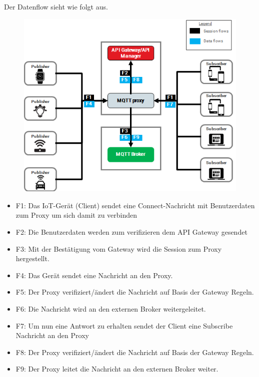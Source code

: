     Der Datenflow sieht wie folgt aus.
    \begin{figure}[h]%
        \centering
        \includegraphics[width=14cm]{tex/bilder/2_grundlagen/axway-mqtt-proxy02_short.png}
        \label{fig:axway-proxy}
    \end{figure}
    \begin{itemize}
        \item F1: Das \ac{IoT}-Gerät (Client) sendet eine Connect-Nachricht mit Benutzerdaten zum Proxy um sich damit zu verbinden
        \item F2: Die Benutzerdaten werden zum verifizieren dem API Gateway gesendet
        \item F3: Mit der Bestätigung vom Gateway wird die Session zum Proxy hergestellt.
        \item F4: Das Gerät sendet eine Nachricht an den Proxy.
        \item F5: Der Proxy verifiziert/ändert die Nachricht auf Basis der Gateway Regeln.
        \item F6: Die Nachricht wird an den externen Broker weitergeleitet.
        \item F7: Um nun eine Antwort zu erhalten sendet der Client eine Subscribe Nachricht an den Proxy
        \item F8: Der Proxy verifiziert/ändert die Nachricht auf Basis der Gateway Regeln.
        \item F9: Der Proxy leitet die Nachricht an den externen Broker weiter.
    \end{itemize}
